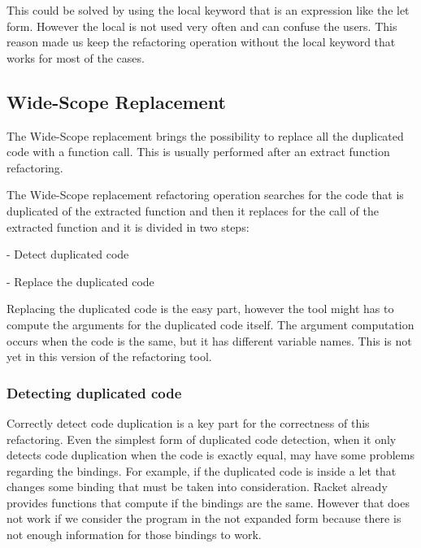 This could be solved by using the local keyword that is an expression like
the let form.
However the local is not used very often and can confuse the users. This reason
made us keep the refactoring operation without the local keyword that works for
most of the cases.




\subsection{Wide-Scope Replacement} %
The Wide-Scope replacement brings the possibility to replace all the duplicated
code with a function call. This is usually performed after an extract function refactoring.

The Wide-Scope replacement refactoring operation searches for the code that is duplicated of the extracted function and then it replaces for the call of the
extracted function and it is divided in two steps: %

- Detect duplicated code

- Replace the duplicated code

Replacing the duplicated code is the easy part, however the tool might has to compute %
the arguments for the duplicated code itself. The argument computation occurs when
the code is the same, but it has different variable names. This is not yet in this
version of the refactoring tool. %

\subsubsection{Detecting duplicated code}
Correctly detect code duplication is a key part for the correctness of this refactoring.
Even the simplest form of duplicated code detection, when it only detects code duplication
when the code is exactly equal, may have some problems regarding the bindings.
For example, if the duplicated code is inside a let that changes some binding that must
be taken into consideration.
Racket already provides functions that compute if the bindings are the same.
However that does not work if we consider the program in the not expanded
form because there is not enough information for those bindings to work. %

